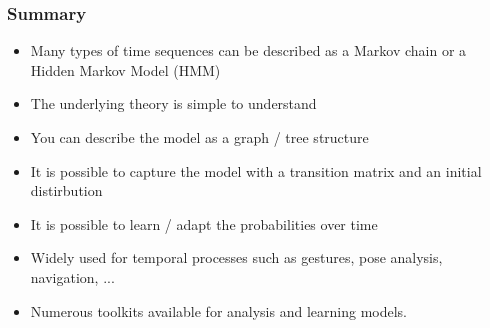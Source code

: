 \documentclass[10pt]{beamer}
\begin{document}
\begin{frame}
  \frametitle{Summary}
  \begin{itemize}
  \item Many types of time sequences can be described as a Markov chain or a Hidden Markov Model (HMM)
  \item The underlying theory is simple to understand
  \item You can describe the model as a graph / tree structure
  \item It is possible to capture the model with a transition matrix and an initial distirbution
  \item It is possible to learn / adapt the probabilities over time
  \item Widely used for temporal processes such as gestures, pose analysis, navigation, ...
  \item Numerous toolkits available for analysis and learning models.
  \end{itemize}
\end{frame}
\end{document}
